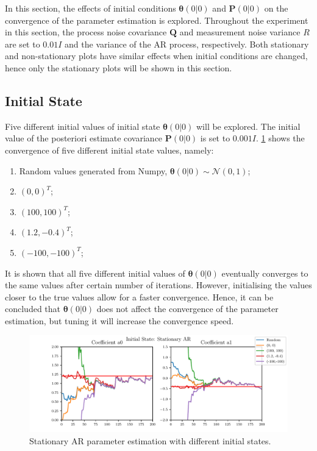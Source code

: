 \documentclass{article}
\begin{document}
In this section, the effects of initial conditions $\bm{\theta}(0|0)$ and $\bm{P}(0|0)$ on the convergence of the parameter estimation is explored. Throughout the experiment in this section, the process noise covariance $\bm{Q}$ and measurement noise variance $R$ are set to $0.01I$ and the variance of the AR process, respectively. Both stationary and non-stationary plots have similar effects when initial conditions are changed, hence only the stationary plots will be shown in this section.

\subsection{Initial State} \label{sec:initial_state}

Five different initial values of initial state $\bm{\theta}(0|0)$ will be explored. The initial value of the posteriori estimate covariance $\bm{P}(0|0)$ is set to $0.001I$. \cref{fig:initial} shows the convergence of five different initial state values, namely:
\begin{enumerate}
    \item Random values generated from Numpy, $\bm{\theta}(0|0) \sim \mathcal{N}(0, 1)$;
    \item $(0, 0)^T$;
    \item $(100, 100)^T$;
    \item $(1.2, -0.4)^T$;
    \item $(-100, -100)^T$;
\end{enumerate}

It is shown that all five different initial values of $\bm{\theta}(0|0)$ eventually converges to the same values after certain number of iterations. However, initialising the values closer to the true values allow for a faster convergence. Hence, it can be concluded that $\bm{\theta}(0|0)$ does not affect the convergence of the parameter estimation, but tuning it will increase the convergence speed.

\begin{figure}[h!]
    \includegraphics[width=\textwidth]{Figures/initial_stationary.pdf}
    \caption{Stationary AR parameter estimation with different initial states.}
    \label{fig:initial}
\end{figure}
\end{document}
